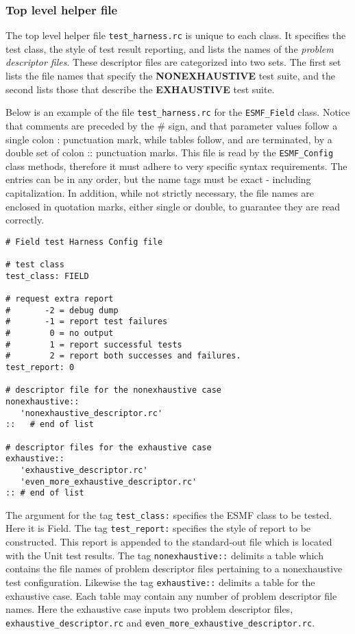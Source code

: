 
\subsubsection{Top level helper file}
The top level helper file \texttt{test\_harness.rc} is unique to each class. It specifies the test class, the style of test result reporting, and lists the names of the \textit{problem descriptor files}. These descriptor files are categorized into two sets. The first set lists the file names that specify the \textbf{NONEXHAUSTIVE} test suite, and the second lists those that describe the \textbf{EXHAUSTIVE} test suite. 

Below is an example of the file \texttt{test\_harness.rc} for the \texttt{ESMF\_Field} class. Notice that comments are preceded by the {\#} sign, and that parameter values follow a single colon {:} punctuation mark, while tables follow, and are terminated, by a double set of colon {::} punctuation marks.  This file is read by the \texttt{ESMF\_Config} class methods, therefore it must adhere to very specific syntax requirements. The entries can be in any order, but the name tags must be exact - including capitalization. In addition, while not strictly necessary, the file names are enclosed in quotation marks, either single or double, to guarantee they are read correctly.
\begin{verbatim}
# Field test Harness Config file

# test class
test_class: FIELD 

# request extra report
#       -2 = debug dump
#       -1 = report test failures 
#        0 = no output
#        1 = report successful tests
#        2 = report both successes and failures.
test_report: 0 

# descriptor file for the nonexhaustive case
nonexhaustive::
   'nonexhaustive_descriptor.rc'
::   # end of list

# descriptor files for the exhaustive case
exhaustive::
   'exhaustive_descriptor.rc'
   'even_more_exhaustive_descriptor.rc'
:: # end of list
\end{verbatim}

The argument for the tag \texttt{test\_class:} specifies the ESMF class to be tested. Here it is Field. The tag  \texttt{test\_report:} specifies the style of report to be constructed. This report is appended to the standard-out file which is located with the Unit test results. The tag \texttt{nonexhaustive::} delimits a table which contains the file names of problem descriptor files pertaining to a nonexhaustive test configuration. Likewise the tag \texttt{exhaustive::} delimits a table for the exhaustive case. Each table may contain any number of problem descriptor file names. Here the exhaustive case inputs two problem descriptor files, \texttt{exhaustive\_descriptor.rc} and \texttt{even\_more\_exhaustive\_descriptor.rc}.

